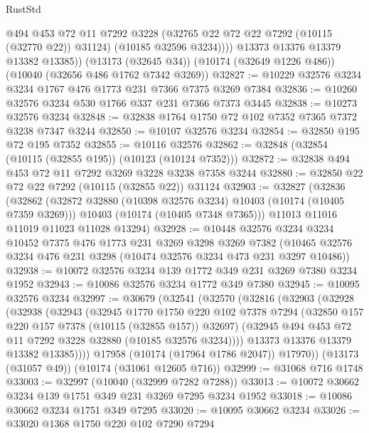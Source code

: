 \begin{lexlean}{RustStd}
\begin{coremodule}
              @494
              @453
              @72
              @11
              @7292
              @3228
              (@32765 @22 @72 @22 @7292 (@10115 (@32770 @22)) @31124)
              (@10185 @32596 @3234))))
        @13373
        @13376
        @13379
        @13382
        @13385))
    (@13173 (@32645 @34))
    (@10174 (@32649 @1226 @486))
    (@10040 (@32656 @486 @1762 @7342 @3269))
@32827 := @10229 @32576 @3234 @3234 @1767 @476 @1773 @231 @7366 @7375 @3269 @7384
@32836 := @10260 @32576 @3234 @530 @1766 @337 @231 @7366 @7373 @3445
@32838 := @10273 @32576 @3234
@32848 := @32838 @1764 @1750 @72 @102 @7352 @7365 @7372 @3238 @7347 @3244
@32850 := @10107 @32576 @3234
@32854 := @32850 @195 @72 @195 @7352
@32855 := @10116 @32576
@32862 := @32848 (@32854 (@10115 (@32855 @195)) (@10123 (@10124 @7352)))
@32872 := @32838 @494 @453 @72 @11 @7292 @3269 @3228 @3238 @7358 @3244
@32880 := @32850 @22 @72 @22 @7292 (@10115 (@32855 @22)) @31124
@32903 := @32827
    (@32836
      (@32862
        (@32872 @32880 (@10398 @32576 @3234) @10403 (@10174 (@10405 @7359 @3269)))
        @10403
        (@10174 (@10405 @7348 @7365)))
      @11013
      @11016
      @11019
      @11023
      @11028
      @13294)
@32928 := @10448
    @32576
    @3234
    @3234
    @10452
    @7375
    @476
    @1773
    @231
    @3269
    @3298
    @3269
    @7382
    (@10465 @32576 @3234 @476 @231 @3298 (@10474 @32576 @3234 @473 @231 @3297 @10486))
@32938 := @10072 @32576 @3234 @139 @1772 @349 @231 @3269 @7380 @3234 @1952
@32943 := @10086 @32576 @3234 @1772 @349 @7380
@32945 := @10095 @32576 @3234
@32997 := @30679
    (@32541
      (@32570
        (@32816
          (@32903
            (@32928
              (@32938
                (@32943
                  (@32945
                    @1770
                    @1750
                    @220
                    @102
                    @7378
                    @7294
                    (@32850 @157 @220 @157 @7378 (@10115 (@32855 @157)) @32697)
                    (@32945 @494 @453 @72 @11 @7292 @3228 @32880 (@10185 @32576 @3234))))
                @13373
                @13376
                @13379
                @13382
                @13385))))
        @17958
        (@10174 (@17964 @1786 @2047))
        @17970))
    (@13173 (@31057 @49))
    (@10174 (@31061 @12605 @716))
@32999 := @31068 @716 @1748
@33003 := @32997 (@10040 (@32999 @7282 @7288))
@33013 := @10072 @30662 @3234 @139 @1751 @349 @231 @3269 @7295 @3234 @1952
@33018 := @10086 @30662 @3234 @1751 @349 @7295
@33020 := @10095 @30662 @3234
@33026 := @33020 @1368 @1750 @220 @102 @7290 @7294

\end{coremodule}
\end{lexlean}
